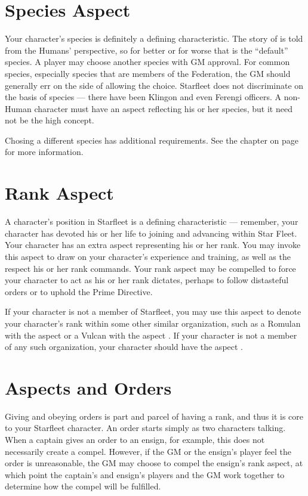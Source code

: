 \documentclass[12pt,titlepage,openany]{book}
\begin{document}
\section{Species Aspect}\label{sec:species}

Your character's species is definitely a defining characteristic. The story of
\StarTrek{} is told from the Humans' perspective, so for better or for worse
that is the ``default'' species. A player may choose another species with GM
approval. For common species, especially species that are members of the
Federation, the GM should generally err on the side of allowing the choice.
Starfleet does not discriminate on the basis of species --- there have been
Klingon and even Ferengi officers. A non-Human character must have an aspect
reflecting his or her species, but it need not be the high concept.

Chosing a different species has additional requirements. See the chapter
 on page~\pageref{chap:species} for more information.

\section{Rank Aspect}\label{sec:rank}

A character's position in Starfleet is a defining characteristic --- remember,
your character has devoted his or her life to joining and advancing within Star
Fleet. Your character has an extra aspect representing his or her rank. You may
invoke this aspect to draw on your character's experience and training, as well
as the respect his or her rank commands. Your rank aspect may be compelled to
force your character to act as his or her rank dictates, perhaps to follow
distasteful orders or to uphold the Prime Directive.

If your character is not a member of Starfleet, you may use this aspect to
denote your character's rank within some other similar organization, such as a
Romulan with the aspect  or a Vulcan with the aspect
. If your character is not a member of any such
organization, your character should have the aspect .

\section{Aspects and Orders}\label{sec:aspects-orders}

Giving and obeying orders is part and parcel of having a rank, and thus it is
core to your Starfleet character. An order starts simply as two characters
talking. When a captain gives an order to an ensign, for example, this does not
necessarily create a compel. However, if the GM or the ensign's player feel the
order is unreasonable, the GM may choose to compel the ensign's rank aspect, at
which point the captain's and ensign's players and the GM work together to
determine how the compel will be fulfilled.
\end{document}
